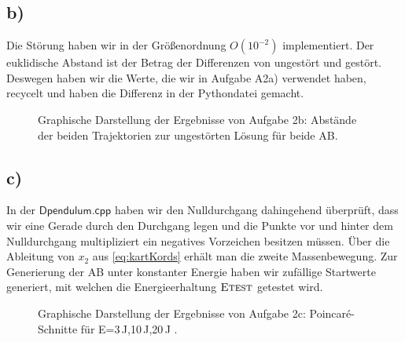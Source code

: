\subsection*{b)}
Die Störung haben wir in der Größenordnung $O(10^{-2})$ implementiert. Der euklidische Abstand ist der Betrag der Differenzen von ungestört und gestört. Deswegen haben wir die Werte, die wir in Aufgabe A2a) verwendet haben, recycelt und haben die Differenz in der Pythondatei gemacht.
\begin{landscape}
	\begin{figure}
		\caption{Graphische Darstellung der Ergebnisse von Aufgabe 2b: Abstände der beiden Trajektorien zur ungestörten Lösung für beide AB.}
		\label{fig:OsziC2}
	\end{figure}
\end{landscape} 
 
\subsection*{c)}
In der $\textsf{Dpendulum.cpp}$ haben wir den Nulldurchgang dahingehend überprüft, dass wir eine Gerade durch den Durchgang legen und die Punkte vor und hinter dem Nulldurchgang multipliziert ein negatives Vorzeichen besitzen müssen. Über die Ableitung von $x_2$ aus \ref{eq:kartKords} erhält man die zweite Massenbewegung. 
Zur Generierung der AB unter konstanter Energie haben wir zufällige Startwerte generiert, mit welchen die Energieerhaltung $\textsc{Etest}$ getestet wird. 
\begin{landscape}
	\begin{figure}
		\caption{Graphische Darstellung der Ergebnisse von Aufgabe 2c: Poincar\'{e}-Schnitte für E=3$\,$J,10$\,$J,20$\,$J .}
		\label{fig:OsziC3}
	\end{figure}
\end{landscape} 


